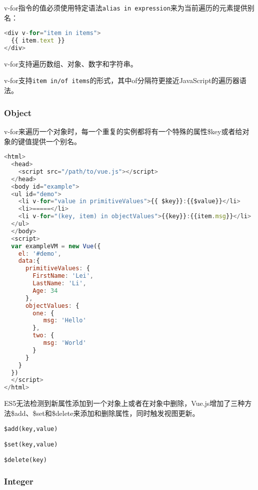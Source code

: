 v-for指令的值必须使用特定语法\texttt{alias in expression}来为当前遍历的元素提供别名：


\begin{lstlisting}[language=JavaScript]
<div v-for="item in items">
  {{ item.text }}
</div>
\end{lstlisting}

v-for支持遍历数组、对象、数字和字符串。




v-for支持\texttt{item in/of items}的形式，其中of分隔符更接近JavaScript的遍历器语法。

\subsubsection{Object}

v-for来遍历一个对象时，每一个重复的实例都将有一个特殊的属性\$key或者给对象的键值提供一个别名。



\begin{lstlisting}[language=JavaScript]
<html>
  <head>
    <script src="/path/to/vue.js"></script>
  </head>
  <body id="example">
  <ul id="demo">
    <li v-for="value in primitiveValues">{{ $key}}:{{$value}}</li>
    <li>=====</li>
    <li v-for="(key, item) in objectValues">{{key}}:{{item.msg}}</li>
  </ul>
  </body>
  <script>
  var exampleVM = new Vue({
    el: '#demo',
    data:{
      primitiveValues: {
        FirstName: 'Lei',
        LastName: 'Li',
        Age: 34
      },
      objectValues: {
        one: {
           msg: 'Hello'
        },
        two: {
           msg: 'World'
        }
      }
    }
  })
  </script>
</html>
\end{lstlisting}

ES5无法检测到新属性添加到一个对象上或者在对象中删除，Vue.js增加了三种方法\$add、\$set和\$delete来添加和删除属性，同时触发视图更新。

\begin{compactitem}
\item \texttt{\$add(key,value)}
\item \texttt{\$set(key,value)}
\item \texttt{\$delete(key)}
\end{compactitem}



\subsubsection{Integer}

